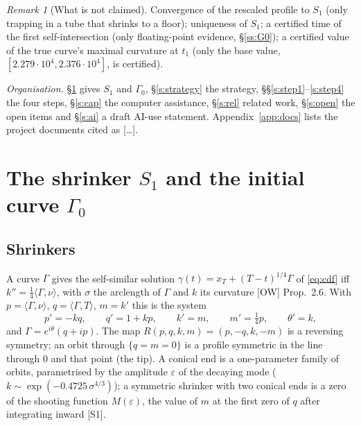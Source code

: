 \documentclass[11pt]{amsart}
\theoremstyle{definition}
\theoremstyle{remark}
\newtheorem{remark}[theorem]{Remark}
\newcommand{\eps}{\varepsilon}
\newcommand{\ip}[2]{\langle #1,#2\rangle}
\newcommand{\dref}[1]{[\textsf{#1}]}
\begin{document}
\begin{remark}[What is not claimed]
Convergence of the rescaled profile to $S_1$ (only trapping in a tube that shrinks to a floor); uniqueness of $S_1$; a certified time of the first self-intersection (only floating-point evidence, \S\ref{ss:G0}); a certified value of the true curve's maximal curvature at $t_1$ (only the base value, $[2.279\cdot10^4,2.376\cdot10^4]$, is certified).
\end{remark}

\noindent\emph{Organisation.} \S\ref{s:data} gives $S_1$ and $\Gamma_0$, \S\ref{s:strategy} the strategy, \S\S\ref{s:step1}--\ref{s:step4} the four steps, \S\ref{s:cap} the computer assistance, \S\ref{s:rel} related work, \S\ref{s:open} the open items and \S\ref{s:ai} a draft AI-use statement. Appendix~\ref{app:docs} lists the project documents cited as \dref{\dots}.

\section{The shrinker \texorpdfstring{$S_1$}{S1} and the initial curve \texorpdfstring{$\Gamma_0$}{Gamma0}}\label{s:data}

\subsection{Shrinkers}
A curve $\Gamma$ gives the self-similar solution $\gamma(t)=x_T+(T-t)^{1/4}\Gamma$ of \eqref{eq:cdf} iff $k''=\frac14\ip{\Gamma}{\nu}$, with $\sigma$ the arclength of $\Gamma$ and $k$ its curvature \dref{OW} Prop.~2.6. With $p=\ip\Gamma\nu$, $q=\ip\Gamma T$, $m=k'$ this is the system
\begin{equation}\label{eq:prof}
p'=-kq,\qquad q'=1+kp,\qquad k'=m,\qquad m'=\tfrac14p,\qquad\theta'=k,
\end{equation}
and $\Gamma=e^{i\theta}(q+ip)$. The map $R(p,q,k,m)=(p,-q,k,-m)$ is a reversing symmetry; an orbit through $\{q=m=0\}$ is a profile symmetric in the line through $0$ and that point (the tip). A conical end is a one-parameter family of orbits, parametrised by the amplitude $\eps$ of the decaying mode ($k\sim\exp(-0.4725\,\sigma^{4/3})$); a symmetric shrinker with two conical ends is a zero of the shooting function $M(\eps)$, the value of $m$ at the first zero of $q$ after integrating inward \dref{S1}.
\end{document}
